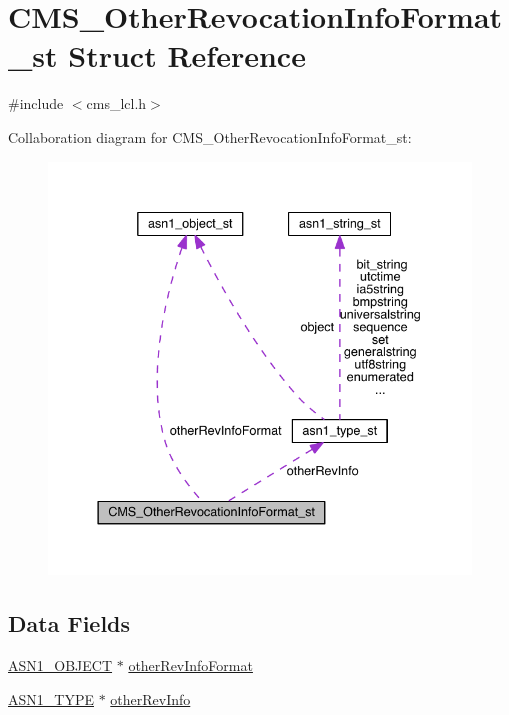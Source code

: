 \hypertarget{struct_c_m_s___other_revocation_info_format__st}{}\section{C\+M\+S\+\_\+\+Other\+Revocation\+Info\+Format\+\_\+st Struct Reference}
\label{struct_c_m_s___other_revocation_info_format__st}


{\ttfamily \#include $<$cms\+\_\+lcl.\+h$>$}



Collaboration diagram for C\+M\+S\+\_\+\+Other\+Revocation\+Info\+Format\+\_\+st\+:\nopagebreak
\begin{figure}[H]
\begin{center}
\leavevmode
\includegraphics[width=337pt]{struct_c_m_s___other_revocation_info_format__st__coll__graph}
\end{center}
\end{figure}
\subsection*{Data Fields}
\begin{DoxyCompactItemize}
\item 
\hyperlink{crypto_2ossl__typ_8h_ae3fda0801e4c8e250087052bafb3ce2e}{A\+S\+N1\+\_\+\+O\+B\+J\+E\+CT} $\ast$ \hyperlink{struct_c_m_s___other_revocation_info_format__st_a1e031f59fb23590a5edeb07047dddfea}{other\+Rev\+Info\+Format}
\item 
\hyperlink{crypto_2asn1_2asn1_8h_a7895e03d9fee2bc4963faf2a31a9439e}{A\+S\+N1\+\_\+\+T\+Y\+PE} $\ast$ \hyperlink{struct_c_m_s___other_revocation_info_format__st_a8a75f598fb65d5e349257ff20a17434c}{other\+Rev\+Info}
\end{DoxyCompactItemize}


